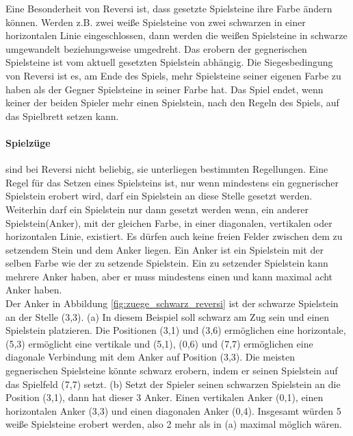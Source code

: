 Eine Besonderheit von Reversi ist, dass gesetzte Spielsteine ihre Farbe ändern können. Werden z.B. zwei weiße Spielsteine von zwei schwarzen in einer horizontalen Linie eingeschlossen, dann werden die weißen Spielsteine in schwarze umgewandelt beziehungsweise umgedreht. Das erobern der gegnerischen Spielsteine ist vom aktuell gesetzten Spielstein abhängig. Die Siegesbedingung von Reversi ist es, am Ende des Spiels, mehr Spielsteine seiner eigenen Farbe zu haben als der Gegner Spielsteine in seiner Farbe hat. Das Spiel endet, wenn keiner der beiden Spieler mehr einen Spielstein, nach den Regeln des Spiels, auf das Spielbrett setzen kann. \\

\paragraph{Spielzüge} sind bei Reversi nicht beliebig, sie unterliegen bestimmten Regellungen. Eine Regel für das Setzen eines Spielsteins ist, nur wenn mindestens ein gegnerischer Spielstein erobert wird, darf ein Spielstein an diese Stelle gesetzt werden. Weiterhin  darf ein Spielstein nur dann gesetzt werden wenn, ein anderer Spielstein(Anker), mit der gleichen Farbe, in einer diagonalen, vertikalen oder horizontalen Linie, existiert. Es dürfen auch keine freien Felder zwischen dem zu setzendem Stein und dem Anker liegen. Ein Anker ist ein Spielstein mit der selben Farbe wie der zu setzende Spielstein. Ein zu setzender Spielstein kann mehrere Anker haben, aber er muss mindestens einen und kann maximal acht Anker haben.\\

Der Anker in Abbildung \ref{fig:zuege_schwarz_reversi} ist der schwarze Spielstein an der Stelle (3,3). (a) In diesem Beispiel soll schwarz am Zug sein und einen Spielstein platzieren. Die Positionen (3,1) und (3,6) ermöglichen eine horizontale, (5,3) ermöglicht eine vertikale und (5,1), (0,6) und (7,7) ermöglichen eine diagonale Verbindung mit dem Anker auf Position (3,3). Die meisten gegnerischen Spielsteine könnte schwarz erobern, indem er seinen Spielstein auf das Spielfeld (7,7) setzt. (b) Setzt der Spieler seinen schwarzen Spielstein an die Position (3,1), dann hat dieser 3 Anker. Einen vertikalen Anker (0,1), einen horizontalen Anker (3,3) und einen diagonalen Anker (0,4). Insgesamt würden 5 weiße Spielsteine erobert werden, also 2 mehr als in (a) maximal möglich wären. \\

